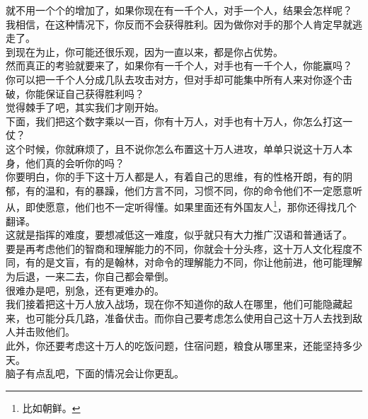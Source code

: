 \begin{multicols}{\theparacolNo}
就不用一个个的增加了，如果你现在有一千个人，对手一个人，结果会怎样呢？\\

我相信，在这种情况下，你反而不会获得胜利。因为做你对手的那个人肯定早就逃走了。\\

到现在为止，你可能还很乐观，因为一直以来，都是你占优势。\\

然而真正的考验就要来了，如果你有一千个人，对手也有一千个人，你能赢吗？\\

你可以把一千个人分成几队去攻击对方，但对手却可能集中所有人来对你逐个击破，你能保证自己获得胜利吗？\\

觉得棘手了吧，其实我们才刚开始。\\

下面，我们把这个数字乘以一百，你有十万人，对手也有十万人，你怎么打这一仗？\\

这个时候，你就麻烦了，且不说你怎么布置这十万人进攻，单单只说这十万人本身，他们真的会听你的吗？\\

你要明白，你的手下这十万人都是人，有着自己的思维，有的性格开朗，有的阴郁，有的温和，有的暴躁，他们方言不同，习惯不同，你的命令他们不一定愿意听从，即使愿意，他们也不一定听得懂。如果里面还有外国友人\footnote{比如朝鲜。}，那你还得找几个翻译。\\

这就是指挥的难度，要想减低这一难度，似乎就只有大力推广汉语和普通话了。\\

要是再考虑他们的智商和理解能力的不同，你就会十分头疼，这十万人文化程度不同，有的是文盲，有的是翰林，对命令的理解能力不同，你让他前进，他可能理解为后退，一来二去，你自己都会晕倒。\\

很难办是吧，别急，还有更难办的。\\

我们接着把这十万人放入战场，现在你不知道你的敌人在哪里，他们可能隐藏起来，也可能分兵几路，准备伏击。而你自己要考虑怎么使用自己这十万人去找到敌人并击败他们。\\

此外，你还要考虑这十万人的吃饭问题，住宿问题，粮食从哪里来，还能坚持多少天。\\

脑子有点乱吧，下面的情况会让你更乱。\\


\end{multicols}
